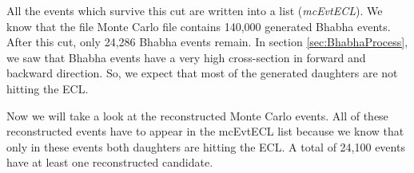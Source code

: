 \documentclass[a4paper,11pt,twosided,final,german,openbib,pdftex,listof=totoc,bibliography=totoc]{scrbook}
\begin{document}
All the events which survive this cut are written into a list (\textit{mcEvtECL}). We know that the file Monte Carlo file contains 140,000 generated Bhabha events. After this cut, only 24,286 Bhabha events remain.
In section \ref{sec:BhabhaProcess}, we saw that Bhabha events have a very high cross-section in forward and backward  direction. So, we expect that most of the generated daughters are not hitting the ECL. 
\newline





Now we will take a look at the reconstructed Monte Carlo events. All of these reconstructed events have to appear in the mcEvtECL list because we know that only in these events both daughters are hitting the ECL. A total of 24,100 events have at least one reconstructed candidate.
\end{document}
